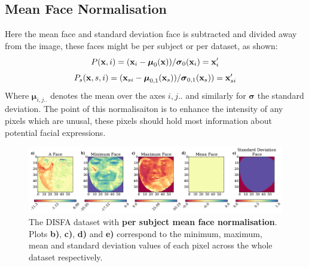     \subsection{Mean Face Normalisation} \label{sec:meanface}
      Here the mean face and standard deviation face is subtracted and divided away from the
      image, these faces might be per subject or per dataset, as shown:
      \begin{equation}
        P({\bf x},i) =  ({\bf x}_{i} - {\boldsymbol \mu}_0( {\bf x}))/{\boldsymbol \sigma}_0({\bf x}_{i})  = {\bf x}_{i}'
      \end{equation}
      \begin{equation}
        P_s({\bf x},s,i) = ({\bf x}_{si} - {\boldsymbol \mu}_{0,1}( {\bf x}_s))/{\boldsymbol \sigma}_{0,1}( {\bf x}_s))  = {\bf x}_{si}'
      \end{equation}
      Where ${\boldsymbol \mu}_{i,j..}$ denotes the mean over the axes $i,j..$ and
      similarly for ${\boldsymbol \sigma} $ the standard deviation.
      The point of this normalisaiton is to enhance the intensity of any pixels which
      are unusal, these pixels should hold most information about potential facial expressions.
      \begin{figure}[!h] \centering
      \includegraphics[width =\hsize]{figures/faces_per_subject_face.pdf}
      \caption{The DISFA dataset with {\bf per subject mean face normalisation}.
      Plots {\bf b)}, {\bf c)}, {\bf d)} and {\bf e)} correspond to the minimum,
      maximum, mean and standard deviation values of each pixel across the whole
      dataset respectively.}
      \label{fig:}
      \end{figure}

